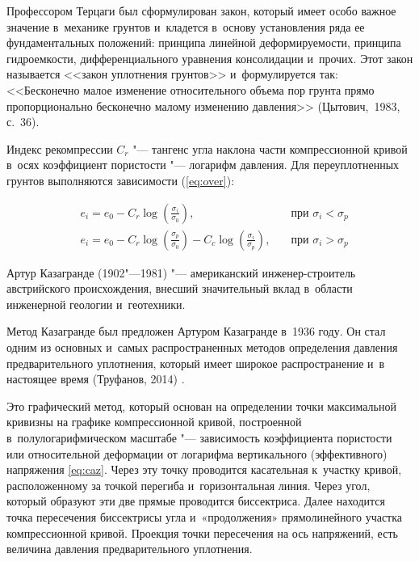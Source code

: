  Профессором Терцаги был сформулирован закон, который имеет особо важное значение в~механике грунтов и~кладется в~основу установления ряда ее фундаментальных положений: 
 принципа линейной деформируемости, 
 принципа гидроемкости, 
 дифференциального уравнения консолидации и~прочих.
 Этот закон называется <<закон уплотнения грунтов>> и~формулируется так: <<Бесконечно малое изменение относительного объема пор грунта прямо пропорционально бесконечно малому изменению давления>> (Цытович,~1983, с.~36)\cite[36]{cytovich1983}.

 Индекс рекомпрессии $C_r$ "--- тангенс угла наклона части компрессионной кривой в~осях коэффициент пористости "--- логарифм давления.
 Для переуплотненных грунтов выполняются зависимости (\ref{eq:over}):

\begin{subequations}
  \label{eq:over}
  \begin{align}
    \label{eq:cr}
    & e_i = e_0 - C_r\log \left(\frac{\sigma_i}{\sigma_0}\right), \quad &\text{при } \sigma_i<\sigma_p \\
    \label{eq:crcc}
    & e_i = e_0 - C_r\log \left(\frac{\sigma_p}{\sigma_0}\right) - C_c\log \left(\frac{\sigma_i}{\sigma_p}\right), \quad &\text{при } \sigma_i>\sigma_p
  \end{align}
\end{subequations}



 
 Артур Казагранде (1902"---1981) "--- американский инженер-строитель австрийского происхождения, внесший значительный вклад в~области инженерной геологии и~геотехники. 
 
 Метод Казагранде был предложен Артуром Казагранде в~1936 году.
 Он стал одним из основных и~самых распространенных методов определения давления предварительного уплотнения, который имеет широкое распространение и~в настоящее время (Труфанов, 2014) \cite{truf2014}.
 
    

 Это графический метод, который основан на определении точки максимальной кривизны на графике компрессионной кривой, построенной в~полулогарифмическом масштабе "--- зависимость коэффициента пористости или относительной деформации от логарифма вертикального (эффективного) напряжения \ref{eq:caz}. 
 Через эту точку проводится касательная к~участку кривой, расположенному за точкой перегиба и~горизонтальная линия. 
 Через угол, который образуют эти две прямые проводится биссектриса. 
 Далее находится точка пересечения биссектрисы угла и~«продолжения» прямолинейного участка компрессионной кривой. Проекция точки пересечения на ось напряжений, есть величина давления предварительного уплотнения. 


